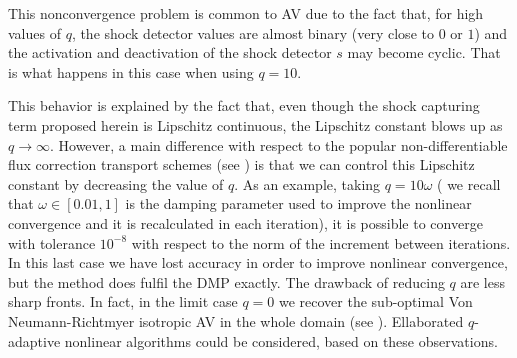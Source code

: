 This nonconvergence problem is common to AV due to the fact that, for high values of $q$, the shock detector values are almost binary (very close to $0$ or $1$) and the activation and deactivation of the shock detector $s$ may become cyclic. That is what happens in this case when using $q=10$. 


This behavior is explained by the fact that, even though the shock capturing term proposed herein is Lipschitz continuous, the Lipschitz constant blows up as $q \to \infty$. However, a main difference with respect to the popular non-differentiable flux correction transport schemes (see \cite{Kuzmin2006513}) is that we can control this Lipschitz constant by decreasing the value of $q$. As an example, taking $q=10\omega$ ( we recall that $\omega\in [0.01,1]$ is the damping parameter used to improve the nonlinear convergence and it is recalculated in each iteration),
it is possible to converge with tolerance $10^{-8}$ with respect to the norm of the increment between iterations. In this last case we have lost accuracy in order to improve nonlinear convergence, but the method does fulfil the DMP exactly. The drawback of reducing $q$ are less sharp fronts. In fact, in the limit case $q = 0$ we recover the sub-optimal Von Neumann-Richtmyer isotropic AV in the whole domain (see ). Ellaborated $q$-adaptive nonlinear algorithms could be considered, based on these observations.
